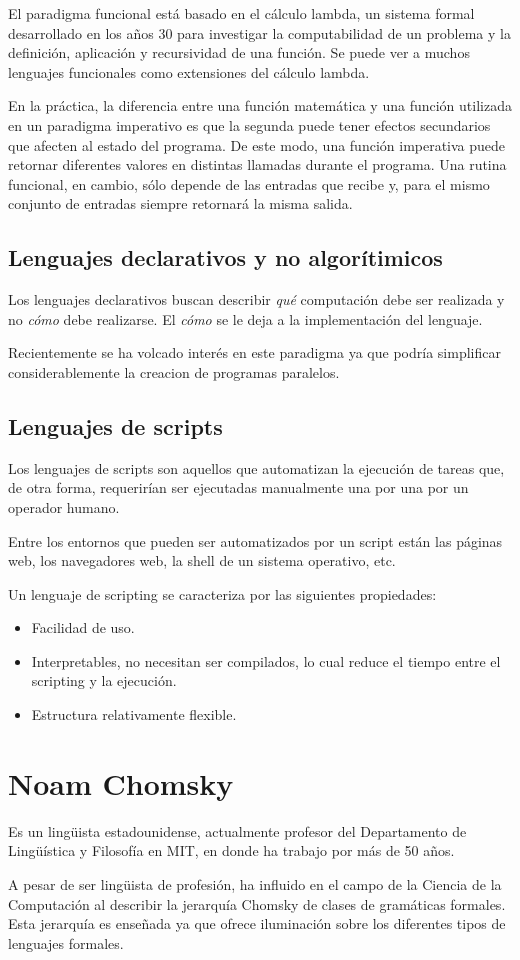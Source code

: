 \documentclass[a4paper,10pt]{article}
\begin{document}
El paradigma funcional está basado en el cálculo lambda, un sistema formal desarrollado en los años 30 para investigar la computabilidad de un problema y la definición, aplicación y recursividad de una función. Se puede ver a muchos lenguajes funcionales como extensiones del cálculo lambda.

En la práctica, la diferencia entre una función matemática y una función utilizada en un paradigma imperativo es que la segunda puede tener efectos secundarios que afecten al estado del programa. De este modo, una función imperativa puede retornar diferentes valores en distintas llamadas durante el programa. Una rutina funcional, en cambio, sólo depende de las entradas que recibe y, para el mismo conjunto de entradas siempre retornará la misma salida.

\subsection{Lenguajes declarativos y no algorítimicos}

Los lenguajes declarativos buscan describir \textit{qué} computación debe ser realizada y no \textit{cómo} debe realizarse. El \textit{cómo} se le deja a la implementación del lenguaje.

Recientemente se ha volcado interés en este paradigma ya que podría simplificar considerablemente la creacion de programas paralelos.

\subsection{Lenguajes de scripts}

Los lenguajes de scripts son aquellos que automatizan la ejecución de tareas que, de otra forma, requerirían ser ejecutadas manualmente una por una por un operador humano.

Entre los entornos que pueden ser automatizados por un script están las páginas web, los navegadores web, la shell de un sistema operativo, etc.

Un lenguaje de scripting se caracteriza por las siguientes propiedades:

\begin{itemize}
\item Facilidad de uso.
\item Interpretables, no necesitan ser compilados, lo cual reduce el tiempo entre el scripting y la ejecución.
\item Estructura relativamente flexible.
\end{itemize}

\section{Noam Chomsky}

Es un lingüista estadounidense, actualmente profesor del Departamento de Lingüística y Filosofía en MIT, en donde ha trabajo por más de 50 años.

A pesar de ser lingüista de profesión, ha influido en el campo de la Ciencia de la Computación al describir la jerarquía Chomsky de clases de gramáticas formales. Esta jerarquía es enseñada ya que ofrece iluminación sobre los diferentes tipos de lenguajes formales.
\end{document}
